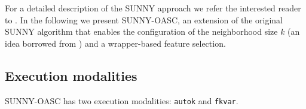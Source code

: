 \documentclass[tablecaption=bottom,wcp]{jmlr} %
\begin{document}
For a detailed description of the SUNNY approach we refer the interested 
reader to \cite{sunny,sunnycp2,paper_amai}.
In the following we present SUNNY-OASC, an extension of the
original SUNNY algorithm that enables the configuration of the neighborhood 
size $k$ 
(an idea borrowed from \cite{DBLP:conf/lion/LindauerBH16}) and a 
wrapper-based feature selection.



\subsection{Execution modalities}

SUNNY-OASC has two execution modalities: \texttt{autok} and 
\texttt{fkvar}.
\end{document}
